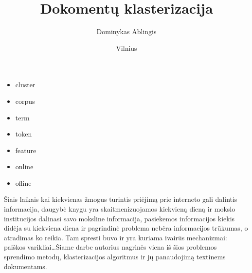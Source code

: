 \documentclass{VUMIFInfKursinis}
\title{Dokomentų klasterizacija}
\author{Dominykas Ablingis}
\date{Vilnius \\ \the\year}
\begin{document}

\newcommand{\ltang}[2]{#1 (angl.\  \textit{#2}) }
\newcommand{\BigO}[1]{$\mathcal{O}(#1)$}

\newcommand{\rewrite}[1]{\todo[linecolor=red,backgroundcolor=red!25,bordercolor=red]{#1}}
\newcommand{\needsource}[1]{\todo[linecolor=blue,backgroundcolor=blue!25,bordercolor=blue,]{#1}}
\newcommand{\toadd}[1]{\todo[linecolor=OliveGreen,backgroundcolor=OliveGreen!25,bordercolor=OliveGreen,]{#1}}
\newcommand{\note}[1]{\todo[linecolor=Plum,backgroundcolor=Plum!25,bordercolor=Plum]{#1}}
\newcommand{\thiswillnotshow}[1]{\todo[disable]{#1}}

\listoftodos[Notes]

\maketitle

\tableofcontents

\begin{itemize}
	\item cluster
	\item corpus
	\item term
	\item token
	\item feature
	\item online
	\item ofline
\end{itemize}

Šiais laikais kai kiekvienas žmogus turintis priėjimą prie interneto gali dalintis informacija, daugybė knygu yra skaitmenizuojamos kiekvieną dieną ir mokslo institucijos dalinasi savo moksline informacija, pasiekemos informacijos kiekis didėja su kiekviena diena ir pagrindinė problema nebėra informacijos trūkumas, o atradimas ko reikia. Tam spresti buvo ir yra kuriama ivairūs mechanizmai: paiškos varikliai\ldots Šiame darbe autorius nagrinės viena iš šios problemos sprendimo metodų, klasterizacijos algoritmus ir jų panaudojimą textinems dokumentams. %
\end{document}
